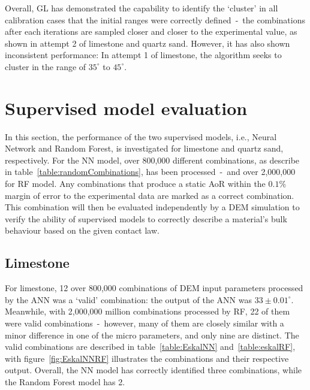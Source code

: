  Overall, GL has demonstrated the capability to identify the `cluster' in all calibration cases that the initial ranges were correctly defined~-~the combinations after each iterations are sampled closer and closer to the experimental value, as shown in attempt 2 of limestone and quartz sand. However, it has also shown inconsistent performance: In attempt 1 of limestone, the algorithm seeks to cluster in the range of $35^{\circ}$ to $45^{\circ}$. 


\section{Supervised model evaluation}\label{section:supervisedPerformance}

In this section, the performance of the two supervised models, i.e., Neural Network and Random Forest, is investigated for limestone and quartz sand, respectively. For the NN model, over 800,000 different combinations, as describe in table~\ref{table:randomCombinations}, has been processed~-~and over 2,000,000 for RF model. Any combinations that produce a static AoR within the $0.1\%$ margin of error to the experimental data are marked as a correct combination. This combination will then be evaluated independently by a DEM simulation to verify the ability of supervised models to correctly describe a material's bulk behaviour based on the given contact law. 

\begin{table}[H]
    \centering
    \caption{Random evenly-spaced microparameters combinations}\label{table:randomCombinations}
\end{table}
    
\subsection{Limestone}

For limestone, 12 over 800,000 combinations of DEM input parameters processed by the ANN was a `valid' combination: the output of the ANN was $33\pm 0.01^{\circ}$. Meanwhile, with 2,000,000 million combinations processed by RF, 22 of them were valid combinations~-~however, many of them are closely similar with a minor difference in one of the micro parameters, and only nine are distinct. The valid combinations are described in table~\ref{table:EskalNN} and~\ref{table:eskalRF}, with figure~\ref{fig:EskalNNRF} illustrates the combinations and their respective output. Overall, the NN model has correctly identified three combinations, while the Random Forest model has 2. 


